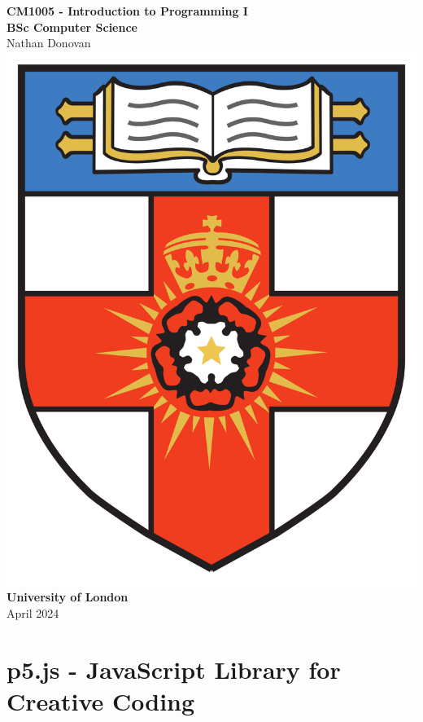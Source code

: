 \documentclass{article}
\begin{document}
\begin{titlepage}
    \centering
    \vspace*{2cm}
    
    {\LARGE\bfseries CM1005 - Introduction to Programming I}\\[0.8cm]
    {\large\bfseries BSc Computer Science}\\[0.5cm] 
    {\large\textnormal{Nathan Donovan}}\\[1.5cm] 

    \includegraphics[scale=0.1]{../images/university-of-london-logo.png}\\[1.5cm] 
    {\Large\bfseries University of London}\\[1cm]
    {\large April 2024}

    \vfill
    
\end{titlepage}

\newpage
\section{p5.js - JavaScript Library for Creative Coding}
\end{document}
